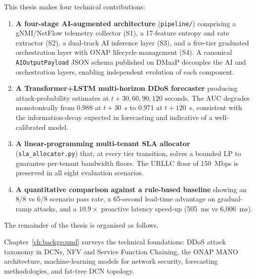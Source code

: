 
This thesis makes four technical contributions:

\begin{enumerate}
  \item \textbf{A four-stage AI-augmented architecture} (\texttt{pipeline/})
        comprising a gNMI/NetFlow telemetry collector (S1), a 17-feature
        entropy and rate extractor (S2), a dual-track AI inference layer
        (S3), and a five-tier graduated orchestration layer with ONAP
        lifecycle management (S4). A canonical \texttt{AIOutputPayload}
        JSON schema published on DMaaP decouples the AI and orchestration
        layers, enabling independent evolution of each component.

  \item \textbf{A Transformer+LSTM multi-horizon DDoS forecaster} producing
        attack-probability estimates at $t{+}30, 60, 90, 120$ seconds. The
        AUC degrades monotonically from 0.988 at $t{+}30$~s to 0.971 at
        $t{+}120$~s, consistent with the information-decay expected in
        forecasting and indicative of a well-calibrated model.

  \item \textbf{A linear-programming multi-tenant SLA allocator}
        (\texttt{sla\_allocator.py}) that, at every tier transition, solves a
        bounded LP to guarantee per-tenant bandwidth floors. The URLLC floor
        of 150~Mbps is preserved in all eight evaluation scenarios.

  \item \textbf{A quantitative comparison against a rule-based baseline}
        showing an 8/8 vs 6/8 scenario pass rate, a 65-second lead-time
        advantage on gradual-ramp attacks, and a $10.9\times$ proactive
        latency speed-up (505~ms vs 6{,}006~ms).
\end{enumerate}


The remainder of the thesis is organised as follows.

Chapter~\ref{ch:background} surveys the technical foundations: DDoS attack
taxonomy in DCNs, NFV and Service Function Chaining, the ONAP MANO
architecture, machine-learning models for network security, forecasting
methodologies, and fat-tree DCN topology.

